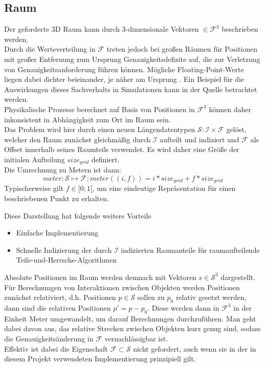 \subsection{Raum}
\label{sec:space}
Der geforderte 3D Raum kann durch 3-dimensionale Vektoren $\in \mathcal{F}^3$ beschrieben werden.\\
Durch die Werteverteilung in $\mathcal{F}$ treten jedoch bei großen Räumen für Positionen mit großer Entfernung zum Ursprung Genauigkeitsdefizite auf, die zur Verletzung von Genauigkeitsanforderung führen können. Mögliche Floating-Point-Werte liegen dabei dichter beieinander, je näher am Ursprung \cite{floatdistribution}. Ein Beispiel für die Auswirkungen dieses Sachverhalts in Simulationen kann in der Quelle \cite{floatdistributionexample} betrachtet werden.\\
Physikalische Prozesse berechnet auf Basis von Positionen in $\mathcal{F}^3$ können daher inkonsistent in Abhängigkeit zum Ort im Raum sein.\\
Das Problem wird hier durch einen neuen Längendatentypen $\mathcal{S} : \mathcal{I} \times \mathcal{F}$ gelöst, welcher den Raum zunächst gleichmäßig durch $\mathcal{I}$ aufteilt und indiziert und $\mathcal{F}$ als Offset innerhalb seines Raumteils verwendet. Es wird daher eine Größe der initialen Aufteilung $size_{grid}$ definiert.\\
Die Umrechnung zu Metern ist dann: $$ meter: \mathcal{S} \mapsto \mathcal{F};  meter((i, f)) = i * size_{grid} + f * size_{grid}$$ 
Typischerweise gilt $f \in [0;1[$, um eine eindeutige Repräsentation für einen beschriebenen Punkt zu erhalten.

Diese Darstellung hat folgende weitere Vorteile
\begin{itemize}
\item Einfache Implementierung
\item Schnelle Indizierung der durch $\mathcal{I}$ indizierten Raumanteile für raumaufteilende Teile-und-Herrsche-Algorithmen
\end{itemize}

Absolute Positionen im Raum werden demnach mit Vektoren $s\in\mathcal{S}^3$ dargestellt. Für Berechnungen von Interaktionen zwischen Objekten werden Positionen zunächst relativiert, d.h. Positionen $p \in \mathcal{S}$ sollen zu $p_0$ relativ gesetzt werden, dann sind die relativen Positionen $p' = p - p_0$. Diese werden dann in $\mathcal{F}^3$ in der Einheit Meter umgewandelt, um darauf Berechnungen durchzuführen. Man geht dabei davon aus, das relative Strecken zwischen Objekten kurz genug sind, sodass die Genauigkeitsänderung in $\mathcal{F}$ vernachlässigbar ist.\\
Effektiv ist dabei die Eigenschaft $\mathcal{F}\subset\mathcal{S}$ nicht gefordert, auch wenn sie in der in diesem Projekt verwendeten Implementierung prinzipiell gilt.

